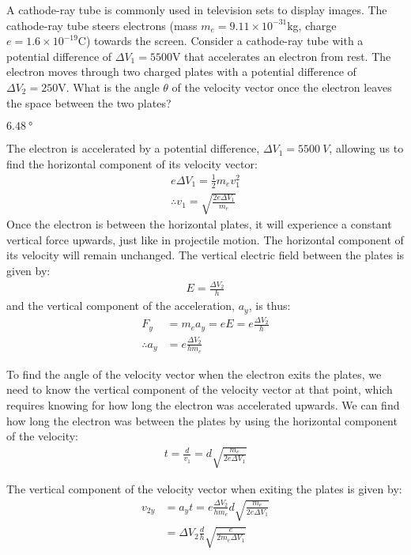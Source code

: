 \question  A cathode-ray tube is commonly used in television sets to display images. The cathode-ray tube steers electrons (mass $m_e = 9.11\times 10^{-31}$kg, charge $e = 1.6\times 10^{-19}$C) towards the screen. Consider a cathode-ray tube with a potential difference of $\Delta V_1 = 5500$V that accelerates an electron from rest. The electron moves through two charged plates with a potential difference of $\Delta V_2 = 250$V. What is the angle $\theta$ of the velocity vector once the electron leaves the space between the two plates?
\begin{finalanswer}
$\SI{6.48}{\degree}$
\end{finalanswer}
\begin{solution}
The electron is accelerated by a potential difference, $\Delta V_1=\SI{5500}{V}$, allowing us to find the horizontal component of its velocity vector:
\begin{align*}
e\Delta V_1=\frac{1}{2}m_ev_1^2\\
\therefore v_1=\sqrt{\frac{2e\Delta V_1}{m_e}}
\end{align*}
Once the electron is between the horizontal plates, it will experience a constant vertical force upwards, just like in projectile motion. The horizontal component of its velocity will remain unchanged. The vertical electric field between the plates is given by:
\begin{align*}
E=\frac{\Delta V_2}{h}
\end{align*}
and the vertical component of the acceleration, $a_y$, is thus:
\begin{align*}
F_y&=m_ea_y=eE=e\frac{\Delta V_2}{h}\\
\therefore a_y&=e\frac{\Delta V_2}{hm_e}
\end{align*}

To find the angle of the velocity vector when the electron exits the plates, we need to know the vertical component of the velocity vector at that point, which requires knowing for how long the electron was accelerated upwards. We can find how long the electron was between the plates by using the horizontal component of the velocity:
\begin{align*}
t=\frac{d}{v_1}=d\sqrt{\frac{m_e}{2e\Delta V_1}}
\end{align*}

The vertical component of the velocity vector when exiting the plates is given by:
\begin{align*}
v_{2y}&=a_yt=e\frac{\Delta V_2}{hm_e}d\sqrt{\frac{m_e}{2e\Delta V_1}}\\
&=\Delta V_2\frac{d}{h}\sqrt{\frac{e}{2m_e\Delta V_1}}
\end{align*}


\end{solution}
